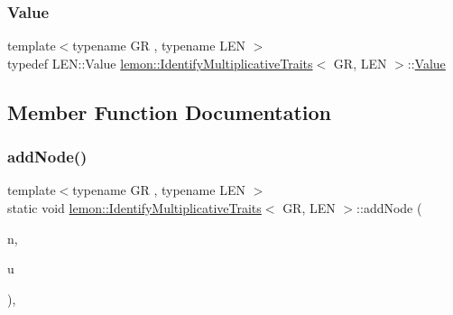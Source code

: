 \subsubsection{\texorpdfstring{Value}{Value}}
{\footnotesize\ttfamily template$<$typename GR , typename L\+EN $>$ \\
typedef L\+E\+N\+::\+Value \hyperlink{structlemon_1_1_identify_multiplicative_traits}{lemon\+::\+Identify\+Multiplicative\+Traits}$<$ GR, L\+EN $>$\+::\hyperlink{structlemon_1_1_identify_multiplicative_traits_ae44c59a817f36ac3d7c024fc75d5ae50}{Value}}



\subsection{Member Function Documentation}
\mbox{\label{structlemon_1_1_identify_multiplicative_traits_afb385c6c785e4fd909345d8c37fe57a7}} 
\subsubsection{\texorpdfstring{add\+Node()}{addNode()}}
{\footnotesize\ttfamily template$<$typename GR , typename L\+EN $>$ \\
static void \hyperlink{structlemon_1_1_identify_multiplicative_traits}{lemon\+::\+Identify\+Multiplicative\+Traits}$<$ GR, L\+EN $>$\+::add\+Node (\begin{DoxyParamCaption}\item[{\hyperlink{structlemon_1_1_identify_multiplicative_traits_a686335471dfcb3c0b7baef1764679a66}{Node\+List} \&}]{n,  }\item[{\hyperlink{structlemon_1_1_identify_multiplicative_traits_a391c4d6be09a511224b23628fbc9c223}{Node}}]{u }\end{DoxyParamCaption})\hspace{0.3cm}{\ttfamily [inline]}, {\ttfamily [static]}}

\mbox{\label{structlemon_1_1_identify_multiplicative_traits_af8070d2658718ee55c51790c25196235}} 
